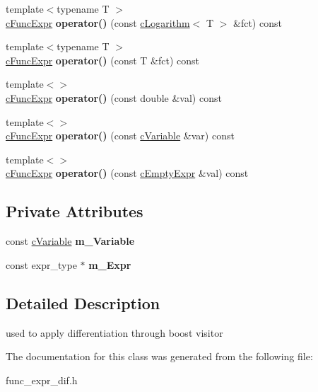 \begin{DoxyCompactItemize}
\item 
\hypertarget{classcDiffVisitor_a92693a584926e03887dbfc7882e49cc9}{{\footnotesize template$<$typename T $>$ }\\\hyperlink{classcFuncExpr}{c\-Func\-Expr} {\bfseries operator()} (const \hyperlink{classcLogarithm}{c\-Logarithm}$<$ T $>$ \&fct) const }\label{classcDiffVisitor_a92693a584926e03887dbfc7882e49cc9}

\item 
\hypertarget{classcDiffVisitor_ae9ef5b0113ad5e7a12cbc2336ef0a393}{{\footnotesize template$<$typename T $>$ }\\\hyperlink{classcFuncExpr}{c\-Func\-Expr} {\bfseries operator()} (const T \&fct) const }\label{classcDiffVisitor_ae9ef5b0113ad5e7a12cbc2336ef0a393}

\item 
\hypertarget{classcDiffVisitor_af3d1042e67043efa599d85a3be714296}{{\footnotesize template$<$$>$ }\\\hyperlink{classcFuncExpr}{c\-Func\-Expr} {\bfseries operator()} (const double \&val) const }\label{classcDiffVisitor_af3d1042e67043efa599d85a3be714296}

\item 
\hypertarget{classcDiffVisitor_adba2c7da458d19cb38c61a62a066c260}{{\footnotesize template$<$$>$ }\\\hyperlink{classcFuncExpr}{c\-Func\-Expr} {\bfseries operator()} (const \hyperlink{classcVariable}{c\-Variable} \&var) const }\label{classcDiffVisitor_adba2c7da458d19cb38c61a62a066c260}

\item 
\hypertarget{classcDiffVisitor_ae7d3209aa1bb8a11858c360fb9d7b695}{{\footnotesize template$<$$>$ }\\\hyperlink{classcFuncExpr}{c\-Func\-Expr} {\bfseries operator()} (const \hyperlink{structcEmptyExpr}{c\-Empty\-Expr} \&val) const }\label{classcDiffVisitor_ae7d3209aa1bb8a11858c360fb9d7b695}

\end{DoxyCompactItemize}
\subsection*{Private Attributes}
\begin{DoxyCompactItemize}
\item 
\hypertarget{classcDiffVisitor_aeadff1de6b52624dd9c8cb99c93e926c}{const \hyperlink{classcVariable}{c\-Variable} {\bfseries m\-\_\-\-Variable}}\label{classcDiffVisitor_aeadff1de6b52624dd9c8cb99c93e926c}

\item 
\hypertarget{classcDiffVisitor_a3a2816b01deebfb4857e8ea14d03529e}{const expr\-\_\-type $\ast$ {\bfseries m\-\_\-\-Expr}}\label{classcDiffVisitor_a3a2816b01deebfb4857e8ea14d03529e}

\end{DoxyCompactItemize}


\subsection{Detailed Description}
used to apply differentiation through boost visitor 

The documentation for this class was generated from the following file\-:\begin{DoxyCompactItemize}
\item 
func\-\_\-expr\-\_\-dif.\-h\end{DoxyCompactItemize}
